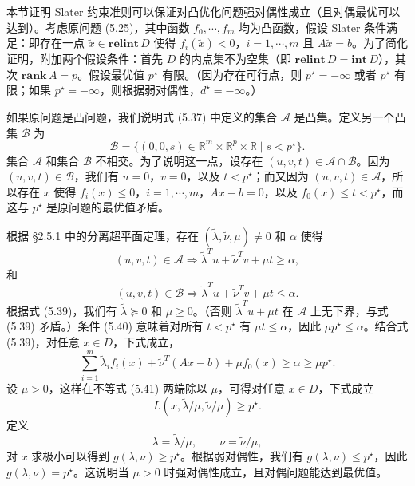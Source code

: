 \documentclass[UTF8,12pt,a4paper,fontset=fandol]{ctexart}
\begin{document}
本节证明 Slater 约束准则可以保证对凸优化问题强对偶性成立（且对偶最优可以达到）。考虑原问题 (5.25)，其中函数 $f_0,\cdots,f_m$ 均为凸函数，假设 Slater 条件满足：即存在一点 $\tilde{x}\in\mathbf{relint}\,D$ 使得 $f_i(\tilde{x})<0$，$i=1,\cdots,m$ 且 $A\tilde{x}=b$。为了简化证明，附加两个假设条件：首先 $D$ 的内点集不为空集（即 $\mathbf{relint}\,D=\mathbf{int}\,D$），其次 $\mathbf{rank}\,A=p$。假设最优值 $p^\star$ 有限。（因为存在可行点，则 $p^\star=-\infty$ 或者 $p^\star$ 有限；如果 $p^\star=-\infty$，则根据弱对偶性，$d^\star=-\infty$。）

如果原问题是凸问题，我们说明式 (5.37) 中定义的集合 $\mathcal{A}$ 是凸集。定义另一个凸集 $\mathcal{B}$ 为
\[
\mathcal{B}=\{(0,0,s)\in\mathbb{R}^m\times\mathbb{R}^p\times\mathbb{R}\mid s<p^\star\}.
\]
集合 $\mathcal{A}$ 和集合 $\mathcal{B}$ 不相交。为了说明这一点，设存在 $(u,v,t)\in\mathcal{A}\cap\mathcal{B}$。因为 $(u,v,t)\in\mathcal{B}$，我们有 $u=0$，$v=0$，以及 $t<p^\star$；而又因为 $(u,v,t)\in\mathcal{A}$，所以存在 $x$ 使得 $f_i(x)\leq 0$，$i=1,\cdots,m$，$Ax-b=0$，以及 $f_0(x)\leq t<p^\star$，而这与 $p^\star$ 是原问题的最优值矛盾。

根据 §2.5.1 中的分离超平面定理，存在 $(\tilde{\lambda},\tilde{\nu},\mu)\neq 0$ 和 $\alpha$ 使得
\begin{equation}
(u,v,t)\in\mathcal{A}\Longrightarrow \tilde{\lambda}^Tu+\tilde{\nu}^Tv+\mu t\geq \alpha,
\tag{5.39}
\end{equation}
和
\begin{equation}
(u,v,t)\in\mathcal{B}\Longrightarrow \tilde{\lambda}^Tu+\tilde{\nu}^Tv+\mu t\leq \alpha.
\tag{5.40}
\end{equation}
根据式 (5.39)，我们有 $\tilde{\lambda}\succeq 0$ 和 $\mu\geq 0$。（否则 $\tilde{\lambda}^Tu+\mu t$ 在 $\mathcal{A}$ 上无下界，与式 (5.39) 矛盾。）条件 (5.40) 意味着对所有 $t<p^\star$ 有 $\mu t\leq \alpha$，因此 $\mu p^\star\leq \alpha$。结合式 (5.39)，对任意 $x\in D$，下式成立，
\begin{equation}
\sum_{i=1}^m \tilde{\lambda}_i f_i(x)+\tilde{\nu}^T(Ax-b)+\mu f_0(x)\geq \alpha\geq \mu p^\star.
\tag{5.41}
\end{equation}
设 $\mu>0$，这样在不等式 (5.41) 两端除以 $\mu$，可得对任意 $x\in D$，下式成立
\[
L(x,\tilde{\lambda}/\mu,\tilde{\nu}/\mu)\geq p^\star.
\]
定义
\[
\lambda=\tilde{\lambda}/\mu,\qquad \nu=\tilde{\nu}/\mu,
\]
对 $x$ 求极小可以得到 $g(\lambda,\nu)\geq p^\star$。根据弱对偶性，我们有 $g(\lambda,\nu)\leq p^\star$，因此 $g(\lambda,\nu)=p^\star$。这说明当 $\mu>0$ 时强对偶性成立，且对偶问题能达到最优值。
\end{document}
